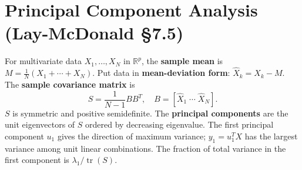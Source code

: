 \section{Principal Component Analysis (Lay-McDonald \S7.5)}

For multivariate data $X_1,\ldots,X_N$ in $\mathbb{R}^p$, the \textbf{sample mean} is $M=\frac{1}{N}(X_1+\cdots+X_N)$. Put data in \textbf{mean-deviation form}: $\hat{X}_k=X_k-M$. The \textbf{sample covariance matrix} is
\[
S = \frac{1}{N-1} B B^T,\quad B=[\hat{X}_1\;\cdots\;\hat{X}_N].
\]
$S$ is symmetric and positive semidefinite. The \textbf{principal components} are the unit eigenvectors of $S$ ordered by decreasing eigenvalue. The first principal component $u_1$ gives the direction of maximum variance; $y_1=u_1^T X$ has the largest variance among unit linear combinations. The fraction of total variance in the first component is $\lambda_1/\operatorname{tr}(S)$.
